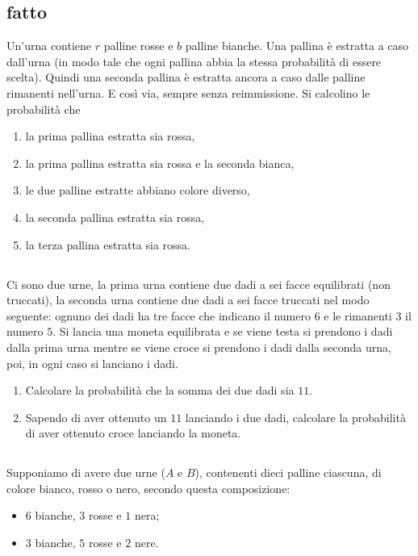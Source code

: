 \subsection{fatto}

Un'urna contiene $r$ palline rosse e $b$ palline bianche. Una pallina è estratta a caso dall'urna (in modo tale che ogni pallina abbia la stessa probabilità di essere scelta). Quindi una seconda pallina è estratta ancora a caso dalle palline rimanenti nell'urna. E così via, sempre senza reimmissione. Si calcolino le probabilità che
\begin{enumerate}
\item la prima pallina estratta sia rossa,
\item la prima pallina estratta sia rossa e la seconda bianca,
\item le due palline estratte abbiano colore diverso,
\item la seconda pallina estratta sia rossa,
\item la terza pallina estratta sia rossa.
\end{enumerate}
\subsection{}

Ci sono due urne, la prima urna contiene due dadi a sei facce equilibrati (non truccati), la seconda urna contiene due dadi a sei facce truccati nel modo seguente: ognuno dei dadi ha tre facce che indicano il numero $6$ e le rimanenti $3$ il numero $5$. Si lancia una moneta equilibrata e se viene testa si prendono i dadi dalla prima urna mentre se viene croce si prendono i dadi dalla seconda urna, poi, in ogni caso si lanciano i dadi.
\begin{enumerate}
\item Calcolare la probabilità che la somma dei due dadi sia $11$.
\item Sapendo di aver ottenuto un $11$ lanciando i due dadi, calcolare la probabilità di aver ottenuto croce lanciando la moneta.
\end{enumerate}
\subsection{}

Supponiamo di avere due urne ($A$ e $B$), contenenti dieci palline ciascuna, di colore bianco, rosso o nero, secondo questa composizione:
\begin{itemize}
\item $6$ bianche, $3$ rosse e $1$ nera;
\item $3$ bianche, $5$ rosse e $2$ nere.
\end{itemize}

